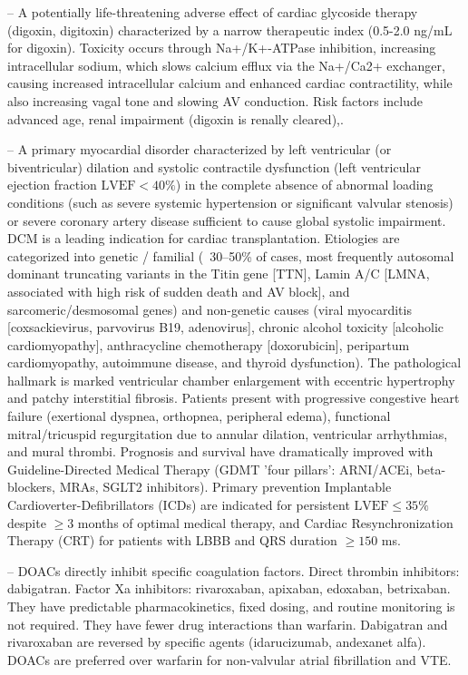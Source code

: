 -- A potentially life-threatening adverse effect of cardiac glycoside therapy (digoxin, digitoxin) characterized by a narrow therapeutic index (0.5-2.0 ng/mL for digoxin). Toxicity occurs through Na+/K+-ATPase inhibition, increasing intracellular sodium, which slows calcium efflux via the Na+/Ca2+ exchanger, causing increased intracellular calcium and enhanced cardiac contractility, while also increasing vagal tone and slowing AV conduction. Risk factors include advanced age, renal impairment (digoxin is renally cleared),.

-- A primary myocardial disorder characterized by left ventricular (or biventricular) dilation and systolic contractile dysfunction (left ventricular ejection fraction $\text{LVEF} < 40\%$) in the complete absence of abnormal loading conditions (such as severe systemic hypertension or significant valvular stenosis) or severe coronary artery disease sufficient to cause global systolic impairment. DCM is a leading indication for cardiac transplantation. Etiologies are categorized into genetic / familial (~30--50\% of cases, most frequently autosomal dominant truncating variants in the Titin gene [TTN], Lamin A/C [LMNA, associated with high risk of sudden death and AV block], and sarcomeric/desmosomal genes) and non-genetic causes (viral myocarditis [coxsackievirus, parvovirus B19, adenovirus], chronic alcohol toxicity [alcoholic cardiomyopathy], anthracycline chemotherapy [doxorubicin], peripartum cardiomyopathy, autoimmune disease, and thyroid dysfunction). The pathological hallmark is marked ventricular chamber enlargement with eccentric hypertrophy and patchy interstitial fibrosis. Patients present with progressive congestive heart failure (exertional dyspnea, orthopnea, peripheral edema), functional mitral/tricuspid regurgitation due to annular dilation, ventricular arrhythmias, and mural thrombi. Prognosis and survival have dramatically improved with Guideline-Directed Medical Therapy (GDMT 'four pillars': ARNI/ACEi, beta-blockers, MRAs, SGLT2 inhibitors). Primary prevention Implantable Cardioverter-Defibrillators (ICDs) are indicated for persistent $\text{LVEF} \le 35\%$ despite $\ge 3$ months of optimal medical therapy, and Cardiac Resynchronization Therapy (CRT) for patients with LBBB and QRS duration $\ge 150$ ms.

-- DOACs directly inhibit specific coagulation factors. Direct thrombin inhibitors: dabigatran. Factor Xa inhibitors: rivaroxaban, apixaban, edoxaban, betrixaban. They have predictable pharmacokinetics, fixed dosing, and routine monitoring is not required. They have fewer drug interactions than warfarin. Dabigatran and rivaroxaban are reversed by specific agents (idarucizumab, andexanet alfa). DOACs are preferred over warfarin for non-valvular atrial fibrillation and VTE.

